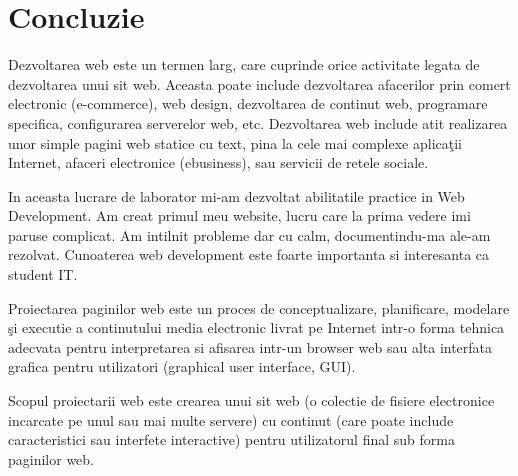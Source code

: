 \section*{Concluzie}


Dezvoltarea web este un termen larg, care cuprinde orice activitate legata de dezvoltarea unui sit web. Aceasta poate include dezvoltarea afacerilor prin comert electronic (e-commerce), web design, dezvoltarea de continut web, programare specifica, configurarea serverelor web, etc. Dezvoltarea web include atit realizarea unor simple pagini web statice cu text, pina la cele mai complexe aplicaţii Internet, afaceri electronice (ebusiness), sau servicii de retele sociale.


In aceasta lucrare de laborator mi-am dezvoltat abilitatile practice in Web Development. Am creat primul meu website, lucru care la prima vedere imi paruse complicat. Am intilnit probleme dar cu calm, documentindu-ma ale-am rezolvat. Cunoaterea web development este foarte importanta si interesanta ca student IT.


Proiectarea paginilor web este un proces de conceptualizare, planificare, modelare şi executie a continutului media electronic livrat pe Internet intr-o forma tehnica adecvata pentru interpretarea si afisarea intr-un browser web sau alta interfata grafica pentru utilizatori (graphical user interface, GUI).

Scopul proiectarii web este crearea unui sit web (o colectie de fisiere electronice incarcate pe unul sau mai multe servere) cu continut (care poate include caracteristici sau interfete interactive) pentru utilizatorul final sub forma paginilor web.
\clearpage
